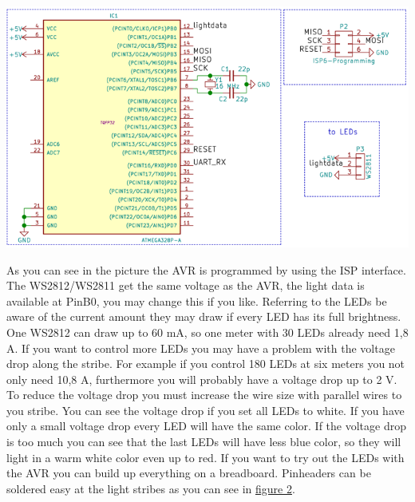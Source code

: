 \begin{DoxyImage}
\includegraphics[width=\textwidth,height=\textheight/2,keepaspectratio=true]{Ws2811_Atmega328_schematic.png}
\caption{schematic of the A\+V\+R to controll W\+S2812/\+W\+S2811}
\end{DoxyImage}
  As you can see in the picture the A\+V\+R is programmed by using the I\+S\+P interface. The W\+S2812/\+W\+S2811 get the same voltage as the A\+V\+R, the light data is available at Pin\+B0, you may change this if you like. Referring to the L\+E\+Ds be aware of the current amount they may draw if every L\+E\+D has its full brightness. One W\+S2812 can draw up to 60 m\+A, so one meter with 30 L\+E\+Ds already need 1,8 A. If you want to control more L\+E\+Ds you may have a problem with the voltage drop along the stribe. For example if you control 180 L\+E\+Ds at six meters you not only need 10,8 A, furthermore you will probably have a voltage drop up to 2 V. To reduce the voltage drop you must increase the wire size with parallel wires to you stribe. You can see the voltage drop if you set all L\+E\+Ds to white. If you have only a small voltage drop every L\+E\+D will have the same color. If the voltage drop is too much you can see that the last L\+E\+Ds will have less blue color, so they will light in a warm white color even up to red. If you want to try out the L\+E\+Ds with the A\+V\+R you can build up everything on a breadboard. Pinheaders can be soldered easy at the light stribes as you can see in \hyperlink{index_two}{figure 2}. \label{index_two}%
\hypertarget{index_two}{}%
  
